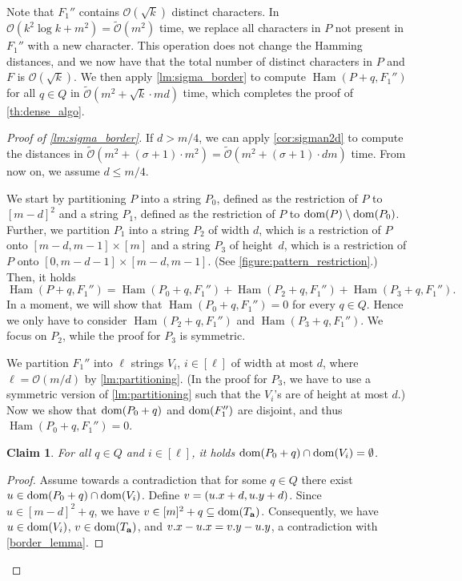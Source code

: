 \documentclass[twoside,leqno]{article}
\let\Cref\cref
\newtheorem{claim}{Claim}[section]
\renewcommand{\O}{\mathcal{O}}
\newcommand{\tO}{\tilde{\mathcal{O}}}
\newcommand{\Ta}{T_\mathbf{a}}
\DeclareMathOperator*{\Ham}{Ham}
\begin{document}
Note that $F_1''$ contains $\O(\sqrt{k})$ distinct characters. In $\O(k^2 \log k + m^2) = \tO(m^2)$ time, we replace all characters in $P$ not present in $F_1''$ with a new character. This operation does not change the Hamming distances, and we now have that the total number of distinct characters in $P$ and $F$ is $\O(\sqrt{k})$. We then apply \cref{lm:sigma_border} to compute $\Ham(P + q, F_1'')$ for all $q \in Q$ in $\tO(m^2 + \sqrt k \cdot md)$ time, which completes the proof of \cref{th:dense_algo}. 
\begin{proof}[{Proof of \cref{lm:sigma_border}}]
If $d > m/4$, we can apply \cref{cor:sigman2d} to compute the distances in $\tO(m^2 + (\sigma+1) \cdot m^2) = \tO(m^2 + (\sigma+1) \cdot dm)$ time. From now on, we assume $d \le m / 4$. 

We start by partitioning $P$ into a string $P_0$, defined as the restriction of $P$ to $[m - d]^2$ and a string $P_1$, defined as the restriction of $P$ to $\operatorname*{dom}(P) \setminus \operatorname*{dom}(P_0)$.
Further, we partition $P_1$ into a string $P_2$ of width $d$, which is a restriction of $P$ onto $[m-d,m - 1]\times [m]$ and a string $P_3$ of height~$d$, which is a restriction of $P$ onto $[0, m-d-1] \times [m-d,m -1]$. (See \cref{figure:pattern_restriction}.) Then, it holds
%
\[ \Ham(P + q, F_1'') = \Ham(P_0 + q, F_1'') + \Ham(P_2 + q, F_1'') + \Ham(P_3 + q, F_1'').\]
%
In a moment, we will show that $\Ham(P_0 + q, F_1'') = 0$ for every $q \in Q$. Hence we only have to consider $\Ham(P_2 + q, F_1'')$ and $\Ham(P_3 + q, F_1'')$. We focus on $P_2$, while the proof for $P_3$ is symmetric.

We partition $F_1''$ into $\ell$ strings $V_i$, $i\in [\ell]$ of width at most $d$, where $\ell = \O(m/d)$ by \cref{lm:partitioning}. (In the proof for $P_3$, we have to use a symmetric version of \cref{lm:partitioning} such that the $V_i$'s are of height at most $d$.) Now we show that $\operatorname*{dom}(P_0+q)$ and $\operatorname*{dom}(F_1'')$ are disjoint, and thus $\Ham(P_0 + q, F_1'') = 0$.

\begin{claim}\label{border_hamming_reduction}
For all $q \in Q$ and $i \in [\ell]$, it holds $\operatorname*{dom}(P_0 + q) \cap \operatorname*{dom}(V_i) = \emptyset$.
\end{claim}
\begin{proof}
Assume towards a contradiction that for some $q \in Q$ there exist $u \in \operatorname*{dom}(P_0 + q) \cap \operatorname*{dom}(V_i)$. Define $v = (u.x + d, u.y + d)$. Since $u \in [m - d]^2 + q$, we have $v \in [m]^2 + q \subseteq \d{\Ta}$. Consequently, we have $u \in \operatorname*{dom}(V_i)$, $v \in \d{\Ta}$, and $v.x - u.x = v.y - u.y$, a contradiction with \Cref{border_lemma}.
\end{proof}



\end{proof}
\end{document}
